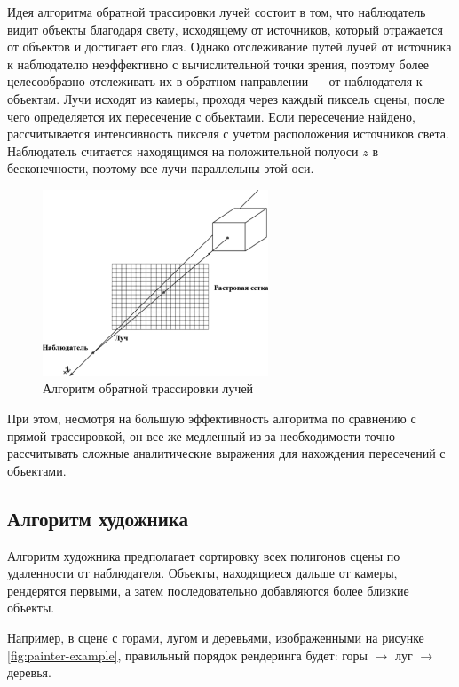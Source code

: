 Идея алгоритма обратной трассировки лучей состоит в том, что наблюдатель видит объекты благодаря свету, исходящему от источников, который отражается от объектов и достигает его глаз. Однако отслеживание путей лучей от источника к наблюдателю неэффективно с вычислительной точки зрения, поэтому более целесообразно отслеживать их в обратном направлении — от наблюдателя к объектам. Лучи исходят из камеры, проходя через каждый пиксель сцены, после чего определяется их пересечение с объектами. Если пересечение найдено, рассчитывается интенсивность пикселя с учетом расположения источников света. Наблюдатель считается находящимся на положительной полуоси $z$ в бесконечности, поэтому все лучи параллельны этой оси. 

\begin{figure}[h] 
	\centering
	\includegraphics[width=0.6\textwidth]{images/reverse-ray-tracing.png}
	\caption{Алгоритм обратной трассировки лучей} 
	\label{fig:reverse-ray-tracing} 
\end{figure}

При этом, несмотря на большую эффективность алгоритма по сравнению с прямой трассировкой, он все же медленный из-за необходимости точно рассчитывать сложные аналитические выражения для нахождения пересечений с объектами.

\subsection{Алгоритм художника}

Алгоритм художника предполагает сортировку всех полигонов сцены по удаленности от наблюдателя. Объекты, находящиеся дальше от камеры, рендерятся первыми, а затем последовательно добавляются более близкие объекты. 

Например, в сцене с горами, лугом и деревьями, изображенными на рисунке \ref{fig:painter-example}, правильный порядок рендеринга будет: горы $\rightarrow$ луг $\rightarrow$ деревья.

